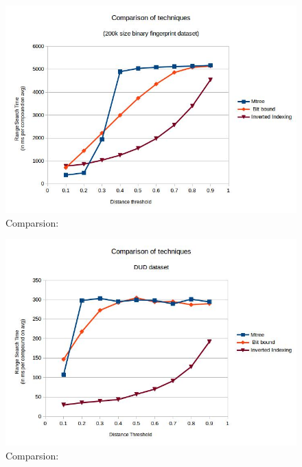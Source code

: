 \begin{figure}[ht]	
\centering
\includegraphics[width=1 \columnwidth]{img/imageC2.jpg}
\caption{Comparsion: }
\label{fig:5I2}
\end{figure}

\begin{figure}[ht]	
\centering
\includegraphics[width=1 \columnwidth]{img/imageC3.jpg}
\caption{Comparsion: }
\label{fig:5I3}
\end{figure}

